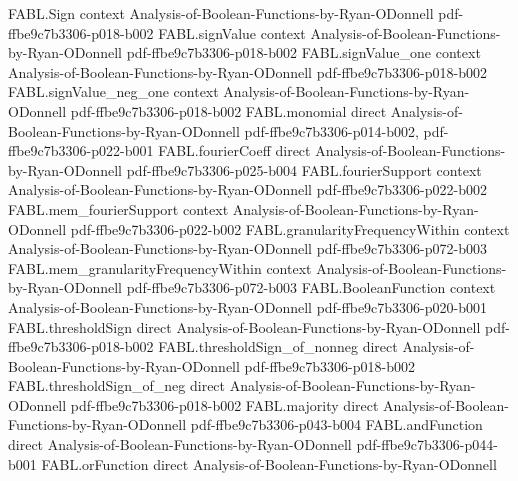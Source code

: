 \begin{theorem}
\label{FABL.tribes_transitiveSymmetric}
\leanok
{}
\proofstep
  {FABL.Sign}
  {context}
  {Analysis-of-Boolean-Functions-by-Ryan-ODonnell}
  {pdf-ffbe9c7b3306-p018-b002}
\proofstep
  {FABL.signValue}
  {context}
  {Analysis-of-Boolean-Functions-by-Ryan-ODonnell}
  {pdf-ffbe9c7b3306-p018-b002}
\proofstep
  {FABL.signValue_one}
  {context}
  {Analysis-of-Boolean-Functions-by-Ryan-ODonnell}
  {pdf-ffbe9c7b3306-p018-b002}
\proofstep
  {FABL.signValue_neg_one}
  {context}
  {Analysis-of-Boolean-Functions-by-Ryan-ODonnell}
  {pdf-ffbe9c7b3306-p018-b002}
\proofstep
  {FABL.monomial}
  {direct}
  {Analysis-of-Boolean-Functions-by-Ryan-ODonnell}
  {pdf-ffbe9c7b3306-p014-b002,
    pdf-ffbe9c7b3306-p022-b001}
\proofstep
  {FABL.fourierCoeff}
  {direct}
  {Analysis-of-Boolean-Functions-by-Ryan-ODonnell}
  {pdf-ffbe9c7b3306-p025-b004}
\proofstep
  {FABL.fourierSupport}
  {context}
  {Analysis-of-Boolean-Functions-by-Ryan-ODonnell}
  {pdf-ffbe9c7b3306-p022-b002}
\proofstep
  {FABL.mem_fourierSupport}
  {context}
  {Analysis-of-Boolean-Functions-by-Ryan-ODonnell}
  {pdf-ffbe9c7b3306-p022-b002}
\proofstep
  {FABL.granularityFrequencyWithin}
  {context}
  {Analysis-of-Boolean-Functions-by-Ryan-ODonnell}
  {pdf-ffbe9c7b3306-p072-b003}
\proofstep
  {FABL.mem_granularityFrequencyWithin}
  {context}
  {Analysis-of-Boolean-Functions-by-Ryan-ODonnell}
  {pdf-ffbe9c7b3306-p072-b003}
\proofstep
  {FABL.BooleanFunction}
  {context}
  {Analysis-of-Boolean-Functions-by-Ryan-ODonnell}
  {pdf-ffbe9c7b3306-p020-b001}
\proofstep
  {FABL.thresholdSign}
  {direct}
  {Analysis-of-Boolean-Functions-by-Ryan-ODonnell}
  {pdf-ffbe9c7b3306-p018-b002}
\proofstep
  {FABL.thresholdSign_of_nonneg}
  {direct}
  {Analysis-of-Boolean-Functions-by-Ryan-ODonnell}
  {pdf-ffbe9c7b3306-p018-b002}
\proofstep
  {FABL.thresholdSign_of_neg}
  {direct}
  {Analysis-of-Boolean-Functions-by-Ryan-ODonnell}
  {pdf-ffbe9c7b3306-p018-b002}
\proofstep
  {FABL.majority}
  {direct}
  {Analysis-of-Boolean-Functions-by-Ryan-ODonnell}
  {pdf-ffbe9c7b3306-p043-b004}
\proofstep
  {FABL.andFunction}
  {direct}
  {Analysis-of-Boolean-Functions-by-Ryan-ODonnell}
  {pdf-ffbe9c7b3306-p044-b001}
\proofstep
  {FABL.orFunction}
  {direct}
  {Analysis-of-Boolean-Functions-by-Ryan-ODonnell}

\end{theorem}
